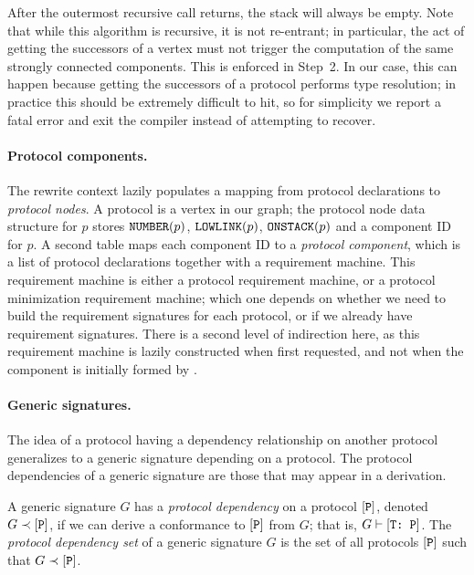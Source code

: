 \documentclass[../generics]{subfiles}
\begin{document}
After the outermost recursive call returns, the stack will always be empty. Note that while this algorithm is recursive, it is not re-entrant; in particular, the act of getting the successors of a vertex must not trigger the computation of the same strongly connected components. This is enforced in Step~2. In our case, this can happen because getting the successors of a protocol performs type resolution; in practice this should be extremely difficult to hit, so for simplicity we report a fatal error and exit the compiler instead of attempting to recover.

\paragraph{Protocol components.} The rewrite context lazily populates a mapping from protocol declarations to \emph{protocol nodes}. A protocol is a vertex in our graph; the protocol node data structure for $p$ stores $\texttt{NUMBER}(p)$, $\texttt{LOWLINK}(p)$, $\texttt{ONSTACK}(p)$ and a component ID for $p$. A second table maps each component ID to a \emph{protocol component}, which is a list of protocol declarations together with a requirement machine. This requirement machine is either a protocol requirement machine, or a protocol minimization requirement machine; which one depends on whether we need to build the requirement signatures for each protocol, or if we already have requirement signatures. There is a second level of indirection here, as this requirement machine is lazily constructed when first requested, and not when the component is initially formed by .

\paragraph{Generic signatures.}
The idea of a protocol having a dependency relationship on another protocol generalizes to a generic signature depending on a protocol. The protocol dependencies of a generic signature are those that may appear in a derivation.

\begin{definition}
A generic signature $G$ has a \emph{protocol dependency} on a protocol $[\texttt{P}]$, denoted \index{$\prec$}$G\prec[\texttt{P}]$, if we can derive a conformance to $[\texttt{P}]$ from $G$; that is, $G\vdash[\texttt{T:~P}]$. The \emph{protocol dependency set} of a generic signature $G$ is the set of all protocols $[\texttt{P}]$ such that $G\prec[\texttt{P}]$.

\end{definition}
\end{document}
